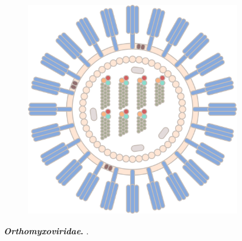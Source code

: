 \begin{figure}
\begin{adjustbox}{minipage=\dimexpr{}\fboxrule,fbox}
\begin{subfigure}[b]{0.475\textwidth}
            \includegraphics[width=\textwidth]{Graphics/Influenza_B.pdf}
        \end{subfigure}
    \end{adjustbox}
    \caption[\textit{Orthomyxoviridae}]{\textbf{\textit{Orthomyxoviridae}.} .}
    \label{fig:Orthomyxoviridae}
\end{figure}

